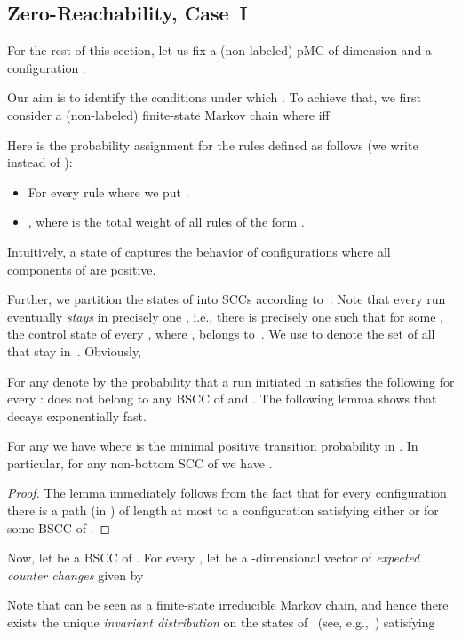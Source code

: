 \subsection{Zero-Reachability, Case~I}
\label{sec-case1}

For the rest of this section, let us fix a (non-labeled) 
pMC  of dimension  and 
a configuration . 

Our aim is to identify the conditions under which
. To achieve that, we 
first consider a (non-labeled) finite-state Markov chain
 where  iff 

Here  is the probability assignment
for the rules defined as follows (we write 
instead of ):
\begin{itemize}
\item For every rule  where 
  we put .
\item ,
  where  is the total weight of all rules of the form
  .
\end{itemize}
Intuitively, a state  of  captures the behavior of 
configurations  where all components of  are
positive. 

Further, we partition the states of 
 into SCCs  according to~. Note that every 
run  eventually \emph{stays} in precisely
one , i.e., there is precisely one  
such that for some , the control state of every ,
where , belongs to~. 
We use  to denote 
the set of all  that stay in~. 
Obviously,


  For any  denote by  the probability that a run  initiated in  satisfies the following for every :  does not belong to any BSCC of  and . The following lemma shows that  decays exponentially fast.

\begin{lemma}\label{lem:F_A-BSCC}
  For any  we have  where  is the minimal positive transition probability in .
  In particular, for any non-bottom SCC  of  we have 
  .
\end{lemma}
\begin{proof}
 The lemma immediately follows from the fact that for every configuration  there is a path (in ) of length at most  to a configuration  satisfying either  or  for some BSCC  of .
\end{proof}


Now, let  be a BSCC of . For every , let 
 be a -dimensional vector of \emph{expected counter changes}
given by 

Note that  can be seen
as a finite-state irreducible Markov chain, and hence there exists the
unique \emph{invariant distribution}  on the states of~ 
(see, e.g.,~\cite{KS:book}) satisfying

